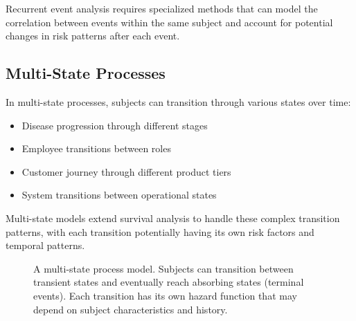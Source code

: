Recurrent event analysis requires specialized methods that can model the correlation between events within the same subject and account for potential changes in risk patterns after each event.

\subsection{Multi-State Processes}

In multi-state processes, subjects can transition through various states over time:

\begin{itemize}
\item Disease progression through different stages
\item Employee transitions between roles
\item Customer journey through different product tiers
\item System transitions between operational states
\end{itemize}

Multi-state models extend survival analysis to handle these complex transition patterns, with each transition potentially having its own risk factors and temporal patterns.

\begin{figure}[htbp]
  \centering
  \caption{A multi-state process model. Subjects can transition between transient states and eventually reach absorbing states (terminal events). Each transition has its own hazard function that may depend on subject characteristics and history.}
  \label{fig:multi-state}
\end{figure}

